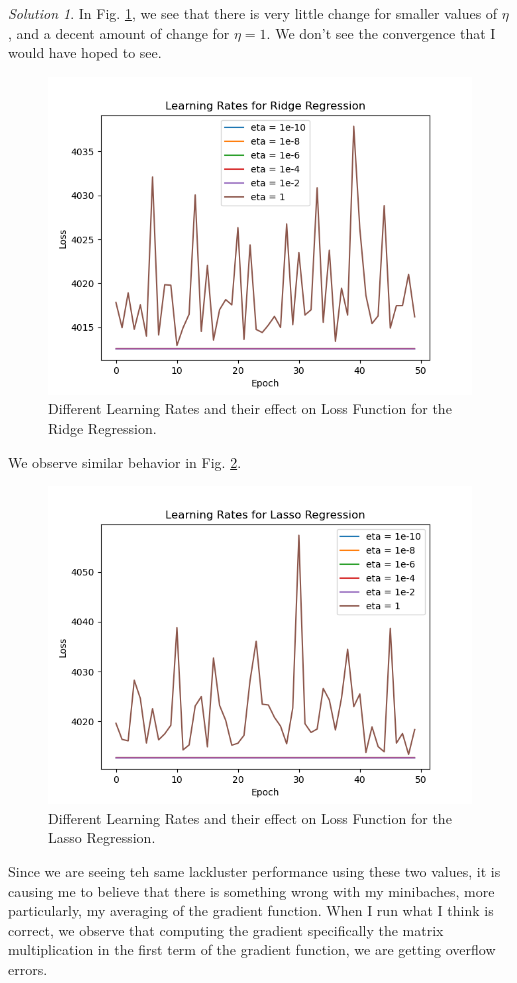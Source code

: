 \documentclass[a4paper,12pt]{article}
\theoremstyle{definition}
\theoremstyle{remark}
\newtheorem*{solution}{Solution}
\begin{document}
\begin{enumerate}
\begin{enumerate}
\begin{solution}
			In Fig. \ref{fig:ridgeregression}, we see that there is very little change for smaller values of $\eta$, and a decent amount of change for $\eta=1$. We don't see the convergence that I would have hoped to see.
			\begin{figure}[h]
				\centering
				\includegraphics[width=0.7\linewidth]{"RidgeRegression"}
				\caption{Different Learning Rates and their effect on Loss Function for the Ridge Regression.}
				\label{fig:ridgeregression}
			\end{figure}
			We observe similar behavior in Fig. \ref{fig:lassoregression}. 
			\begin{figure}
				\centering
				\includegraphics[width=0.7\linewidth]{"LassoRegression"}
				\caption{Different Learning Rates and their effect on Loss Function for the Lasso Regression.}
				\label{fig:lassoregression}
			\end{figure}
			Since we are seeing teh same lackluster performance using these two values, it is causing me to believe that there is something wrong with my minibaches, more particularly, my averaging of the gradient function. When I run what I think is correct, we observe that computing the gradient specifically the matrix multiplication in the first term of the gradient function, we are getting overflow errors.
			

\end{solution}
\end{enumerate}
\end{enumerate}
\end{document}
